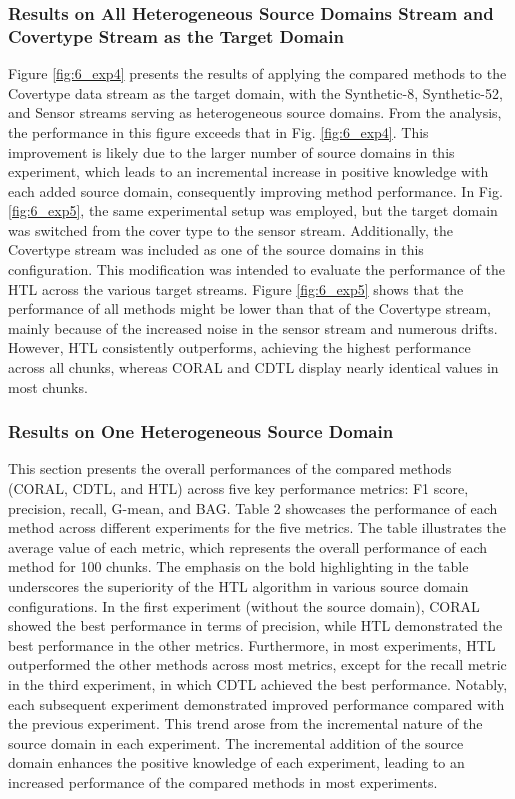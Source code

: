 \subsubsection{Results on All Heterogeneous Source Domains Stream and Covertype Stream as the Target Domain}
Figure \ref{fig:6_exp4} presents the results of applying the compared methods to the Covertype data stream as the target domain, with the Synthetic-8, Synthetic-52, and Sensor streams serving as heterogeneous source domains. From the analysis, the performance in this figure exceeds that in Fig. \ref{fig:6_exp4}. This improvement is likely due to the larger number of source domains in this experiment, which leads to an incremental increase in positive knowledge with each added source domain, consequently improving method performance. In Fig. \ref{fig:6_exp5}, the same experimental setup was employed, but the target domain was switched from the cover type to the sensor stream. Additionally, the Covertype stream was included as one of the source domains in this configuration. This modification was intended to evaluate the performance of the HTL across the various target streams. Figure \ref{fig:6_exp5} shows that the performance of all methods might be lower than that of the Covertype stream, mainly because of the increased noise in the sensor stream and numerous drifts. However, HTL consistently outperforms, achieving the highest performance across all chunks, whereas CORAL and CDTL display nearly identical values in most chunks.

\subsubsection{Results on One Heterogeneous Source Domain}
This section presents the overall performances of the compared methods (CORAL, CDTL, and HTL) across five key performance metrics: F1 score, precision, recall, G-mean, and BAG. Table 2 showcases the performance of each method across different experiments for the five metrics. The table illustrates the average value of each metric, which represents the overall performance of each method for 100 chunks. The emphasis on the bold highlighting in the table underscores the superiority of the HTL algorithm in various source domain configurations. In the first experiment (without the source domain), CORAL showed the best performance in terms of precision, while HTL demonstrated the best performance in the other metrics. Furthermore, in most experiments, HTL outperformed the other methods across most metrics, except for the recall metric in the third experiment, in which CDTL achieved the best performance. Notably, each subsequent experiment demonstrated improved performance compared with the previous experiment. This trend arose from the incremental nature of the source domain in each experiment. The incremental addition of the source domain enhances the positive knowledge of each experiment, leading to an increased performance of the compared methods in most experiments.

